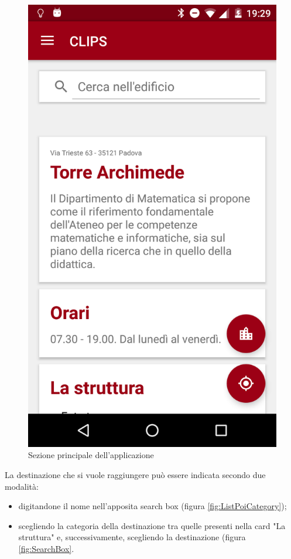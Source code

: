 \documentclass[../Sperimentazione.tex]{subfiles}
\begin{document}
			\begin{figure} [h]
				\centering
				\includegraphics[scale=0.2]{img/home_cards}
				\caption{Sezione principale dell'applicazione}
				\label{fig:HomeCards}
			\end{figure}

	
		La destinazione che si vuole raggiungere può essere indicata secondo due modalità:
		\begin{itemize}
			\item digitandone il nome nell'apposita search box (figura \ref{fig:ListPoiCategory});
			\item scegliendo la categoria della destinazione tra quelle presenti nella card "La struttura" e, successivamente, scegliendo la destinazione (figura \ref{fig:SearchBox}.
		\end{itemize}
		
\end{document}
